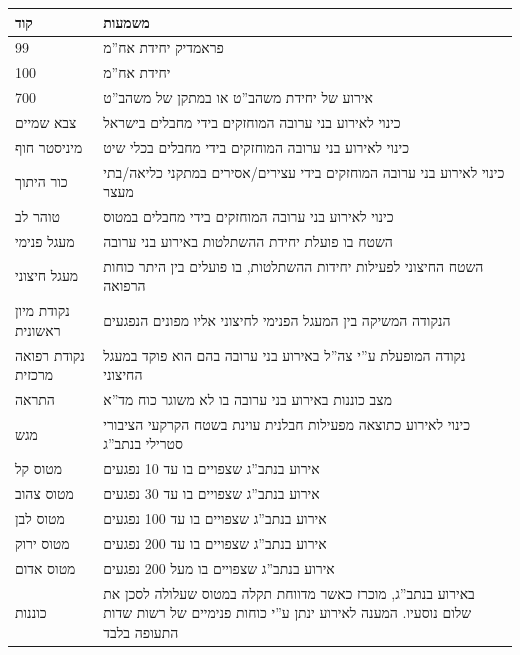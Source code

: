 \documentclass{article}
\begin{document}
\begin{center}
    \begin{tabularx}{\textwidth}{XX}
        \toprule
        קוד & משמעות \\
        \midrule
        99 & פראמדיק יחידת אח''מ \\
        \midrule
        100 & יחידת אח''מ \\
        \midrule
        700 & אירוע של יחידת משהב''ט או במתקן של משהב''ט \\
        \midrule
        צבא שמיים & כינוי לאירוע בני ערובה המוחזקים בידי מחבלים בישראל \\
        \midrule
        מיניסטר חוף &  כינוי לאירוע בני ערובה המוחזקים בידי מחבלים בכלי שיט \\
        \midrule
        כור היתוך & כינוי לאירוע בני ערובה המוחזקים בידי עצירים/אסירים במתקני כליאה/בתי מעצר \\
        \midrule
        טוהר לב & כינוי לאירוע בני ערובה המוחזקים בידי מחבלים במטוס \\
        \midrule
        מעגל פנימי & השטח בו פועלת יחידת ההשתלטות באירוע בני ערובה \\
        \midrule
        מעגל חיצוני & השטח החיצוני לפעילות יחידות ההשתלטות, בו פועלים בין היתר כוחות הרפואה \\
        \midrule
        נקודת מיון ראשונית & הנקודה המשיקה בין המעגל הפנימי לחיצוני אליו מפונים הנפגעים \\
        \midrule
        נקודת רפואה מרכזית & נקודה המופעלת ע''י צה''ל באירוע בני ערובה בהם הוא פוקד במעגל החיצוני \\
        \midrule
        התראה & מצב כוננות באירוע בני ערובה בו לא משוגר כוח מד''א \\
        \midrule
        מגש & כינוי לאירוע כתוצאה מפעילות חבלנית עוינת בשטח הקרקעי הציבורי סטרילי בנתב''ג \\
        \midrule
        מטוס קל & אירוע בנתב''ג שצפויים בו עד 10 נפגעים \\
        \midrule
        מטוס צהוב & אירוע בנתב''ג שצפויים בו עד 30 נפגעים \\
        \midrule
        מטוס לבן & אירוע בנתב''ג שצפויים בו עד 100 נפגעים \\
        \midrule
        מטוס ירוק & אירוע בנתב''ג שצפויים בו עד 200 נפגעים \\
        \midrule
        מטוס אדום & אירוע בנתב''ג שצפויים בו מעל 200 נפגעים \\
        \midrule
        כוננות & באירוע בנתב''ג, מוכרז כאשר מדווחת תקלה במטוס שעלולה לסכן את שלום נוסעיו. המענה לאירוע ינתן ע''י כוחות פנימיים של רשות שדות התעופה בלבד \\

\end{tabularx}
\end{center}
\end{document}
